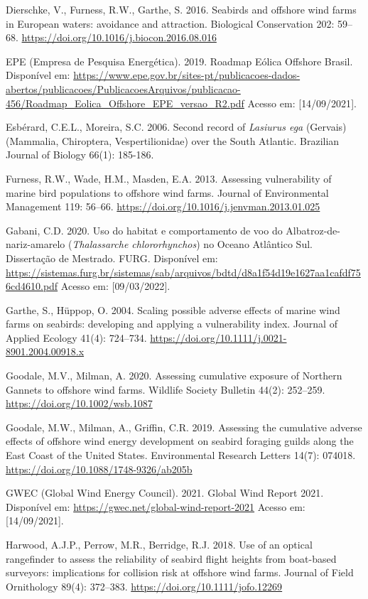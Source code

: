 \documentclass[
  oneside]{scrbook}
\begin{document}
Dierschke, V., Furness, R.W., Garthe, S. 2016. Seabirds and offshore wind farms in European waters: avoidance and attraction. Biological Conservation 202: 59--68. \url{https://doi.org/10.1016/j.biocon.2016.08.016}

EPE (Empresa de Pesquisa Energética). 2019. Roadmap Eólica Offshore Brasil. Disponível em: \url{https://www.epe.gov.br/sites-pt/publicacoes-dados-abertos/publicacoes/PublicacoesArquivos/publicacao-456/Roadmap_Eolica_Offshore_EPE_versao_R2.pdf} Acesso em: {[}14/09/2021{]}.

Esbérard, C.E.L., Moreira, S.C. 2006. Second record of \emph{Lasiurus ega} (Gervais) (Mammalia, Chiroptera, Vespertilionidae) over the South Atlantic. Brazilian Journal of Biology 66(1): 185-186.

Furness, R.W., Wade, H.M., Masden, E.A. 2013. Assessing vulnerability of marine bird populations to offshore wind farms. Journal of Environmental Management 119: 56--66. \url{https://doi.org/10.1016/j.jenvman.2013.01.025}

Gabani, C.D. 2020. Uso do habitat e comportamento de voo do Albatroz-de-nariz-amarelo (\emph{Thalassarche chlororhynchos}) no Oceano Atlântico Sul. Dissertação de Mestrado. FURG. Disponível em: \url{https://sistemas.furg.br/sistemas/sab/arquivos/bdtd/d8a1f54d19e1627aa1cafdf756cd4610.pdf} Acesso em: {[}09/03/2022{]}.

Garthe, S., Hüppop, O. 2004. Scaling possible adverse effects of marine wind farms on seabirds: developing and applying a vulnerability index. Journal of Applied Ecology 41(4): 724--734. \url{https://doi.org/10.1111/j.0021-8901.2004.00918.x}

Goodale, M.V., Milman, A. 2020. Assessing cumulative exposure of Northern Gannets to offshore wind farms. Wildlife Society Bulletin 44(2): 252--259. \url{https://doi.org/10.1002/wsb.1087}

Goodale, M.W., Milman, A., Griffin, C.R. 2019. Assessing the cumulative adverse effects of offshore wind energy development on seabird foraging guilds along the East Coast of the United States. Environmental Research Letters 14(7): 074018. \url{https://doi.org/10.1088/1748-9326/ab205b}

GWEC (Global Wind Energy Council). 2021. Global Wind Report 2021. Disponível em: \url{https://gwec.net/global-wind-report-2021} Acesso em: {[}14/09/2021{]}.

Harwood, A.J.P., Perrow, M.R., Berridge, R.J. 2018. Use of an optical rangefinder to assess the reliability of seabird flight heights from boat-based surveyors: implications for collision risk at offshore wind farms. Journal of Field Ornithology 89(4): 372--383. \url{https://doi.org/10.1111/jofo.12269}
\end{document}
